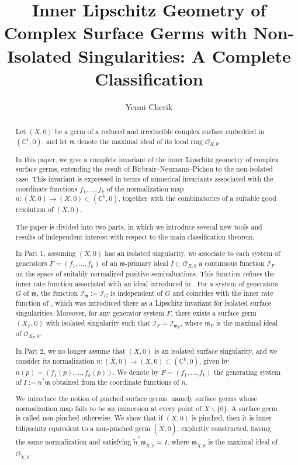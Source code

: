 \documentclass[reqno,dvipsnames,12pt]{amsart}
\title{Inner Lipschitz Geometry of Complex Surface Germs with Non-Isolated Singularities: A Complete Classification}
\author{Yenni Cherik}
\date{}
\renewcommand{\setminus}{\smallsetminus}
\begin{document}
\maketitle
\begin{abstract}
Let $(X,0)$ be a germ of a reduced and irreducible complex surface embedded in $(\mathbb{C}^k,0)$, and let $\mathfrak{m}$ denote the maximal ideal of its local ring $\mathcal{O}_{X,0}$.

In this paper, we give a complete invariant of the inner Lipschitz geometry of complex surface germs, extending the result of Birbrair--Neumann--Pichon \cite{BNP} to the non-isolated case. This invariant is expressed in terms of numerical invariants associated with the coordinate functions $f_1,\dots,f_k$ of the normalization map
$n:(\overline{X},0)\to (X,0)\subset(\mathbb{C}^k,0)$,
together with the combinatorics of a suitable good resolution of $(\overline{X},0)$.

The paper is divided into two parts, in which we introduce several new tools and results of independent interest with respect to the main classification theorem.

In Part 1, assuming $(X,0)$ has an isolated singularity, we associate to each system of generators $F=(f_1,\dots,f_k)$ of an $\mathfrak{m}$-primary ideal $I\subset\mathcal{O}_{X,0}$ a continuous function $\mathcal{I}_F$ on the space of suitably normalized positive semivaluations. This function refines the inner rate function associated with an ideal introduced in \cite{yenni2}. For a system of generators $G$ of $\mathfrak{m}$, the function $\mathcal{I}_{\mathfrak{m}}:=\mathcal{I}_G$ is independent of $G$ and coincides with the inner rate function of \cite{BFP}, which was introduced there as a Lipschitz invariant for isolated surface singularities. Moreover, for any generator system $F$, there exists a surface germ $(X_F,0)$ with isolated singularity such that $\mathcal{I}_F=\mathcal{I}_{\mathfrak{m}_F}$, where $\mathfrak{m}_F$ is the maximal ideal of $\mathcal{O}_{X_F,0}$.

In Part 2, we no longer assume that $(X,0)$ is an isolated surface singularity, and we consider its normalization
$n:(\overline{X},0)\to(X,0) \subset (\mathbb{C}^k,0)$, given by $n(p)=(f_1(p),\dots,f_k(p))$. We denote by $F=(f_1,\dots,f_k)$ the generating system of $I:=n^*\mathfrak{m}$ obtained from the coordinate functions of $n$.

We introduce the notion of pinched surface germs, namely surface germs whose normalization map fails to be an immersion at every point of $\overline{X}\setminus\{0\}$. A surface germ is called non-pinched otherwise. We show that if $(X,0)$ is pinched, then it is inner bilipschitz equivalent to a non-pinched germ $(\widetilde{X},0)$, explicitly constructed, having the same normalization and satisfying $\widetilde{n}^*\mathfrak{m}_{\widetilde{X},0}=I$, where $\mathfrak{m}_{\widetilde{X},0}$ is the maximal ideal of $\mathcal{O}_{\widetilde{X},0}$.


\end{abstract}
\end{document}
